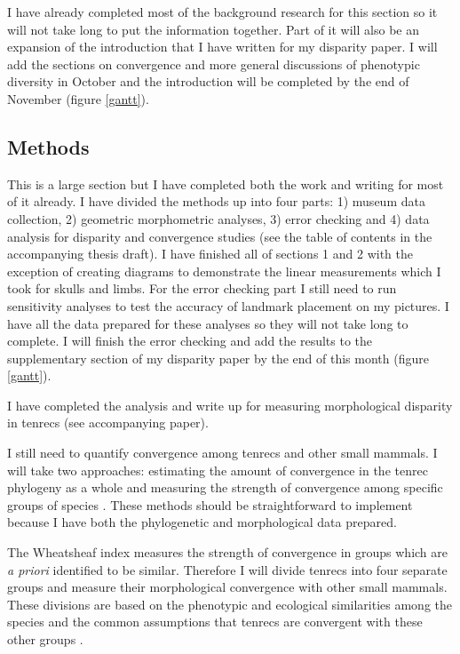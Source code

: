 \documentclass[12pt,a4paper]{article}
\begin{document}
	I have already completed most of the background research for this section so it will not take long to put the information together. Part of it will also be an expansion of the introduction that I have written for my disparity paper. I will add the sections on convergence and more general discussions of phenotypic diversity in October and the introduction will be completed by the end of November (figure \ref*{gantt}).

\subsection{Methods}

	This is a large section but I have completed both the work and writing for most of it already.
	I have divided the methods up into four parts: 1) museum data collection, 2) geometric morphometric analyses, 3) error checking and 4) data analysis for disparity and convergence studies (see the table of contents in the accompanying thesis draft).
	I have finished all of sections 1 and 2 with the exception of creating diagrams to demonstrate the linear measurements which I took for skulls and limbs. For the error checking part I still need to run sensitivity analyses to test the accuracy of landmark placement on my pictures. I have all the data prepared for these analyses so they will not take long to complete. I will finish the error checking and add the results to the supplementary section of my disparity paper by the end of this month (figure \ref{gantt}).
	
	I have completed the analysis and write up for measuring morphological disparity in tenrecs (see accompanying paper).
	
	I still need to quantify convergence among tenrecs and other small mammals. I will take two approaches: estimating the amount of convergence in the tenrec phylogeny as a whole \citep{Stayton2008} and measuring the strength of convergence among specific groups of species \citep{Arbuckle2014}. These methods should be straightforward to implement because I have both the phylogenetic and morphological data prepared. 
	
	The Wheatsheaf index \citep{Arbuckle2014} measures the strength of convergence in groups which are \textit{a priori} identified to be similar. Therefore I will divide tenrecs into four separate groups and measure their morphological convergence with other small mammals. These divisions are based on the phenotypic and ecological similarities among the species and the common assumptions that tenrecs are convergent with these other groups \citep[e.g.][]{Soarimalala2011, Olson2013}. 
	
\end{document}
